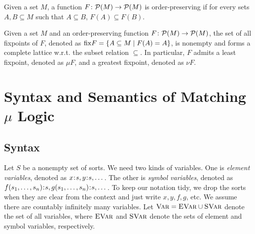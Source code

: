 \documentclass{amsart}
\begin{document}
\begin{definition}
Given a set $M$, a function $F \colon \mathcal{P}(M) \to \mathcal{P}(M)$ is order-preserving if
for every sets $A, B \subseteq M$ such that $A \subseteq B$, 
$F(A) \subseteq F(B)$. 
\end{definition}

\begin{theorem}
Given a set $M$ and an order-preserving function $F \colon \mathcal{P}(M) \to \mathcal{P}(M)$,
the set of all fixpoints of $F$,
denoted as $\mathrm{fix} F = \{ A \subseteq M \mid F(A) = A \}$,
is nonempty and forms a complete lattice w.r.t. the subset relation $\subseteq$.
In particular, $F$ admits a least fixpoint, denoted as $\mu F$, and a greatest fixpoint,
denoted as $\nu F$.
\end{theorem}



\section{Syntax and Semantics of Matching $\mu$ Logic}




\subsection{Syntax}
\label{sec:MmL_sytax}

\begin{notation}[Variables]
\label{not:variables}
Let $S$ be a nonempty set of sorts.
We need two kinds of variables. 
One is \emph{element variables}, denoted as
$x \mathbin{\!:\!} s, y \mathbin{\!:\!} s, \dots$. 
The other is \emph{symbol variables}, denoted as
$f(s_1,\dots,s_n) \mathbin{\!:\!} s, g(s_1,\dots,s_n) \mathbin{\!:\!} s, \dots$. 
To keep our notation tidy,
we drop the sorts when they are clear from the context
and just write $x, y, f, g$, etc.
We assume there are countably infinitely many variables.
Let ${\normalfont\textsc{Var}} = {\normalfont\textsc{EVar}} \cup {\normalfont\textsc{SVar}}$ denote the set of all variables,
where ${\normalfont\textsc{EVar}}$ and ${\normalfont\textsc{SVar}}$ denote the sets of element and symbol variables,
respectively. 
\end{notation}
\end{document}
